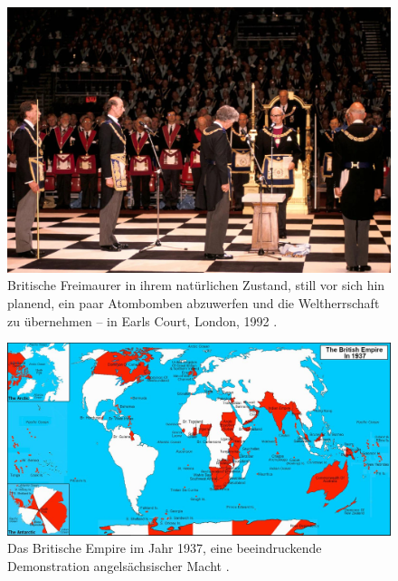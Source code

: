 \documentclass[10pt,twocolumn,letterpaper]{article}
\begin{document}
\begin{figure}[b]
\begin{center}

\includegraphics[width=1\linewidth]{freemason.jpg}
\end{center}
   \caption{Britische Freimaurer in ihrem natürlichen Zustand, still vor sich hin planend, ein paar Atombomben abzuwerfen und die Weltherrschaft zu übernehmen – in Earls Court, London, 1992 \cite{5}.}
\label{fig:1}
\label{fig:onecol}
\end{figure}

\begin{figure}[t]
\begin{center}
\includegraphics[width=1\textwidth]{british.jpg}
\end{center}
   \caption{Das Britische Empire im Jahr 1937, eine beeindruckende Demonstration angelsächsischer Macht \cite{14}.}
   \label{fig:2}
\end{figure}
\end{document}
